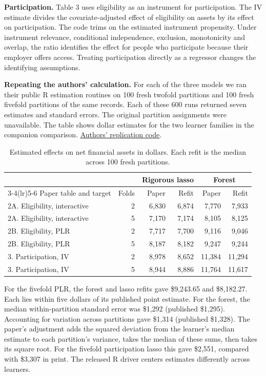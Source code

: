 \textbf{Participation.} Table 3 uses eligibility as an instrument for participation. The IV estimate divides the covariate-adjusted effect of eligibility on assets by its effect on participation. The code trims on the estimated instrument propensity. Under instrument relevance, conditional independence, exclusion, monotonicity and overlap, the ratio identifies the effect for people who participate because their employer offers access. Treating participation directly as a regressor changes the identifying assumptions.

\textbf{Repeating the authors' calculation.} For each of the three models we ran their public R estimation routines on 100 fresh twofold partitions and 100 fresh fivefold partitions of the same records. Each of these 600 runs returned seven estimates and standard errors. The original partition assignments were unavailable. The table shows dollar estimates for the two learner families in the companion comparison. \href{https://github.com/VC2015/DMLonGitHub/tree/b91cbf96c01eccd73367fbd6601ecdd7aa78403b}{Authors' replication code}.

\begin{table}[htbp]
\centering
\caption{Estimated effects on net financial assets in dollars. Each refit is the median across 100 fresh partitions.}
\label{tab:401k-refits}
\small
\setlength{\tabcolsep}{2pt}
\begin{tabular}{@{}lrrrrr@{}}
\toprule
 & & \multicolumn{2}{c}{Rigorous lasso} & \multicolumn{2}{c}{Forest} \\
\cmidrule(lr){3-4}\cmidrule(lr){5-6}
Paper table and target & Folds & Paper & Refit & Paper & Refit \\
\midrule
2A. Eligibility, interactive & 2 & 6,830 & 6,874 & 7,770 & 7,933 \\
2A. Eligibility, interactive & 5 & 7,170 & 7,174 & 8,105 & 8,125 \\
2B. Eligibility, PLR & 2 & 7,717 & 7,700 & 9,116 & 9,046 \\
2B. Eligibility, PLR & 5 & 8,187 & 8,182 & 9,247 & 9,244 \\
3. Participation, IV & 2 & 8,978 & 8,652 & 11,384 & 11,294 \\
3. Participation, IV & 5 & 8,944 & 8,886 & 11,764 & 11,617 \\
\bottomrule
\end{tabular}
\end{table}

For the fivefold PLR, the forest and lasso refits gave \$9,243.65 and \$8,182.27. Each lies within five dollars of its published point estimate. For the forest, the median within-partition standard error was \$1,292 (published \$1,295). Accounting for variation across partitions gave \$1,314 (published \$1,328). The paper's adjustment adds the squared deviation from the learner's median estimate to each partition's variance, takes the median of these sums, then takes its square root. For the fivefold participation lasso this gave \$2,551, compared with \$3,307 in print. The released R driver centers estimates differently across learners.

